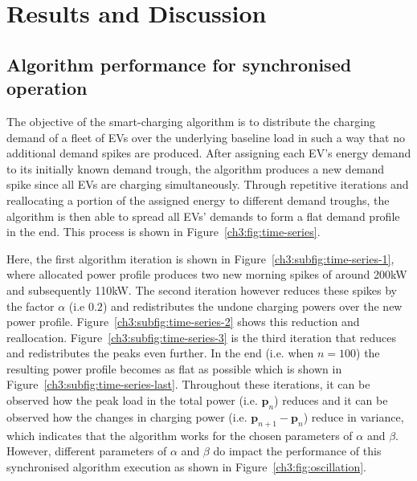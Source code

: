 \section{Results and Discussion}
\label{ch3:sec:results}

\subsection{Algorithm performance for synchronised operation}
\label{ch3:subsec:algorithm-performance-synchronised}

The objective of the smart-charging algorithm is to distribute the charging demand of a fleet of EVs over the underlying baseline load in such a way that no additional demand spikes are produced.
After assigning each EV's energy demand to its initially known demand trough, the algorithm produces a new demand spike since all EVs are charging simultaneously.
Through repetitive iterations and reallocating a portion of the assigned energy to different demand troughs, the algorithm is then able to spread all EVs' demands to form a flat demand profile in the end.
This process is shown in Figure~\ref{ch3:fig:time-series}.





Here, the first algorithm iteration is shown in Figure~\ref{ch3:subfig:time-series-1}, where allocated power profile produces two new morning spikes of around 200kW and subsequently 110kW.
The second iteration however reduces these spikes by the factor $\alpha$ (i.e $0.2$) and redistributes the undone charging powers over the new power profile.
Figure~\ref{ch3:subfig:time-series-2} shows this reduction and reallocation.
Figure~\ref{ch3:subfig:time-series-3} is the third iteration that reduces and redistributes the peaks even further.
In the end (i.e. when $n=100$) the resulting power profile becomes as flat as possible which is shown in Figure~\ref{ch3:subfig:time-series-last}.
Throughout these iterations, it can be observed how the peak load in the total power (i.e. $\textbf{p}_n$) reduces and it can be observed how the changes in charging power (i.e. $\textbf{p}_{n+1}-\textbf{p}_n$) reduce in variance, which indicates that the algorithm works for the chosen parameters of $\alpha$ and $\beta$.
However, different parameters of $\alpha$ and $\beta$ do impact the performance of this synchronised algorithm execution as shown in Figure~\ref{ch3:fig:oscillation}.

